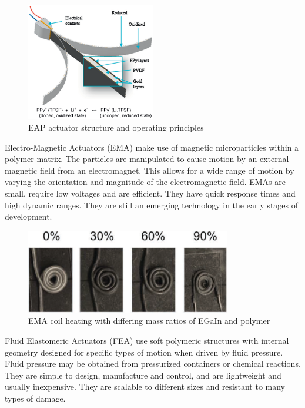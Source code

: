 \begin{figure}[H]
	\centering
	\includegraphics[width=0.5\textwidth]{EAP.png}
	\caption[EAP actuator structure]{EAP actuator structure and operating principles \citep{Mutlu2014}}
	\label{fig:eap}
\end{figure}

Electro-Magnetic Actuators (EMA) make use of magnetic microparticles within a polymer matrix. The particles are manipulated to cause motion by an external magnetic field from an electromagnet. This allows for a wide range of motion by varying the orientation and magnitude of the electromagnetic field. EMAs are small, require low voltages and are efficient. They have quick response times and high dynamic ranges. They are still an emerging technology in the early stages of development. \citep{Do2018}

\begin{figure}[H]
	\centering
	\includegraphics[width=0.8\textwidth]{EMA.png}
	\caption[EMA coil heating]{EMA coil heating with differing mass ratios of EGaIn and polymer \citep{Do2018}}
	\label{fig:ema}
\end{figure}

Fluid Elastomeric Actuators (FEA) use soft polymeric structures with internal geometry designed for specific types of motion when driven by fluid pressure. Fluid pressure may be obtained from pressurized containers or chemical reactions. They are simple to design, manufacture and control, and are lightweight and usually inexpensive. They are scalable to different sizes and resistant to many types of damage. \citep{Shepherd2011, Onal2017}


